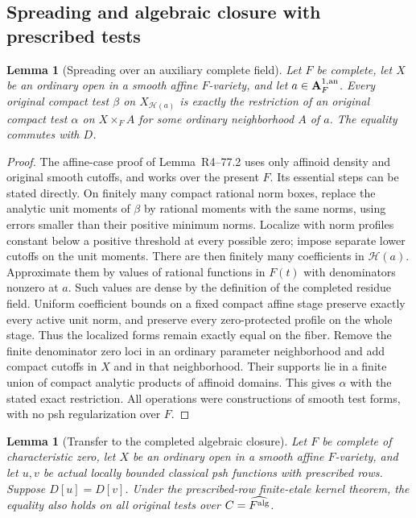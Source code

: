 \documentclass[11pt,a4paper]{article}
\numberwithin{equation}{section}
\newtheorem{lemma}[theorem]{Lemma}
\theoremstyle{definition}
\theoremstyle{remark}
\begin{document}
\subsection{Spreading and algebraic closure with prescribed tests}

\begin{lemma}[Spreading over an auxiliary complete field]
\label{lem:r5-auxiliary-field-test-spreading}
Let $F$ be complete, let $X$ be an ordinary open in a smooth affine
$F$-variety, and let $a\in\mathbf A_F^{1,\rm an}$.  Every original
compact test $\beta$ on $X_{\mathscr H(a)}$ is exactly the restriction
of an original compact test $\alpha$ on $X\times_F A$ for some
ordinary neighborhood $A$ of $a$.  The equality commutes with $D$.
\end{lemma}

\begin{proof}
The affine-case proof of
Lemma~\textup{R4--77.2} uses only affinoid
density and original smooth cutoffs, and works over the present
$F$.  Its essential steps can be stated directly.  On finitely many
compact rational norm boxes, replace the analytic unit moments of
$\beta$ by rational moments with the same norms, using errors
smaller than their positive minimum norms.  Localize with norm
profiles constant below a positive threshold at every possible
zero; impose separate lower cutoffs on the unit moments.  There
are then finitely many coefficients in $\mathscr H(a)$.
Approximate them by values of rational functions in $F(t)$ with
denominators nonzero at $a$.  Such values are dense by the
definition of the completed residue field.  Uniform coefficient
bounds on a fixed compact affine stage preserve exactly every
active unit norm, and preserve every zero-protected profile on the
whole stage.  Thus the localized forms remain exactly equal on
the fiber.  Remove the finite denominator zero loci in an ordinary
parameter neighborhood and add compact cutoffs in $X$ and in that
neighborhood.  Their supports lie in a finite union of compact
analytic products of affinoid domains.  This gives $\alpha$ with
the stated exact restriction.  All operations were constructions
of smooth test forms, with no psh regularization over $F$.
\end{proof}

\begin{lemma}[Transfer to the completed algebraic closure]
\label{lem:r5-completed-algebraic-kernel}
Let $F$ be complete of characteristic zero, let $X$ be an ordinary
open in a smooth affine $F$-variety, and let $u,v$ be actual locally
bounded classical psh functions with prescribed rows.  Suppose
$D[u]=D[v]$.  Under the prescribed-row finite-etale
kernel theorem, the equality also holds on all original tests over
$C=\widehat{F^{\rm alg}}$.
\end{lemma}
\end{document}
